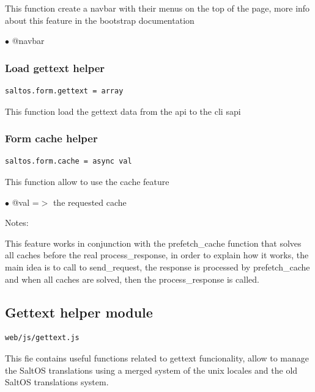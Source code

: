 \documentclass[a4paper]{article}
\begin{document}
This function create a navbar with their menus on the top of the page, more
info about this feature in the bootstrap documentation

\begin{compactitem}
\item[\color{myblue}$\bullet$] @navbar
\end{compactitem}

\hypertarget{toc234}{}
\subsubsection{Load gettext helper}

\begin{lstlisting}
saltos.form.gettext = array
\end{lstlisting}

This function load the gettext data from the api to the cli sapi

\hypertarget{toc235}{}
\subsubsection{Form cache helper}

\begin{lstlisting}
saltos.form.cache = async val
\end{lstlisting}

This function allow to use the cache feature

\begin{compactitem}
\item[\color{myblue}$\bullet$] @val =$>$ the requested cache
\end{compactitem}

Notes:

This feature works in conjunction with the prefetch\_cache function that
solves all caches before the real process\_response, in order to explain
how it works, the main idea is to call to send\_request, the response is
processed by prefetch\_cache and when all caches are solved, then the
process\_response is called.

\hypertarget{toc236}{}
\subsection{Gettext helper module}

\begin{lstlisting}
web/js/gettext.js
\end{lstlisting}

This fie contains useful functions related to gettext funcionality, allow to manage the
SaltOS translations using a merged system of the unix locales and the old SaltOS translations
system.
\end{document}
